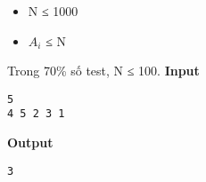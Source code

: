 \begin{itemize}
	\item N ≤ 1000
	\item $A_{i}$ ≤ N
\end{itemize}

Trong 70\% số test, N ≤ 100.
\textbf{Input }
\begin{verbatim}
5
4 5 2 3 1\end{verbatim}

\textbf{Output }
\begin{verbatim}
3\end{verbatim}